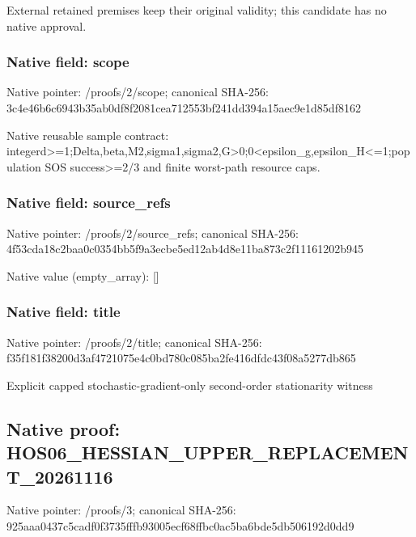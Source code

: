 \documentclass[10pt,a4paper]{article}
\begin{document}
\begingroup\raggedright\sloppy External retained premises keep their original validity;\allowbreak{} this candidate has no native approval.\par\endgroup

\subsubsection{Native field: scope}
Native pointer: /proofs/2/scope; canonical SHA-256: 3c4e46b6c6943b35ab0df8f2081cea712553bf241dd394a15aec9e1d85df8162

\begingroup\raggedright\sloppy Native reusable sample contract:\allowbreak{} integerd>=\allowbreak{}1;\allowbreak{}Delta,\allowbreak{}beta,\allowbreak{}M2,\allowbreak{}sigma1,\allowbreak{}sigma2,\allowbreak{}G>0;\allowbreak{}0<epsilon\_\allowbreak{}g,\allowbreak{}epsilon\_\allowbreak{}H<=\allowbreak{}1;\allowbreak{}population SOS success>=\allowbreak{}2/\allowbreak{}3 and finite worst-path resource caps.\par\endgroup

\subsubsection{Native field: source\_\allowbreak{}refs}
Native pointer: /proofs/2/source\_\allowbreak{}refs; canonical SHA-256: 4f53cda18c2baa0c0354bb5f9a3ecbe5ed12ab4d8e11ba873c2f11161202b945

Native value (empty\_\allowbreak{}array): []

\subsubsection{Native field: title}
Native pointer: /proofs/2/title; canonical SHA-256: f35f181f38200d3af4721075e4c0bd780c085ba2fe416dfdc43f08a5277db865

\begingroup\raggedright\sloppy Explicit capped stochastic-gradient-only second-order stationarity witness\par\endgroup

\subsection{Native proof: HOS06\_\allowbreak{}HESSIAN\_\allowbreak{}UPPER\_\allowbreak{}REPLACEMENT\_\allowbreak{}20261116}
Native pointer: /proofs/3; canonical SHA-256: 925aaa0437c5cadf0f3735fffb93005ecf68ffbc0ac5ba6bde5db506192d0dd9
\end{document}
